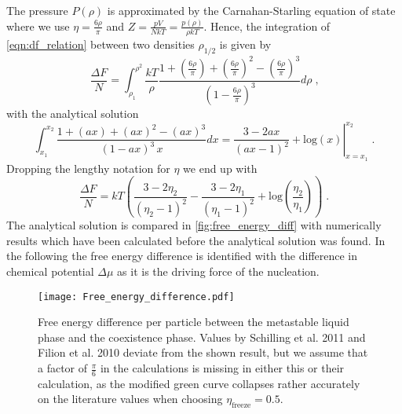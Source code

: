 The pressure $P(\rho)$ is approximated by the Carnahan-Starling equation of state where we use $\eta = \frac{6 \rho }{\pi}$ and $Z=\frac{pV}{NkT} = \frac{p(\rho)}{\rho kT}$. Hence, the integration of \autoref{eqn:df_relation} between two densities $\rho_{1/2}$ is given by
\begin{equation}
\frac{\Delta F}{N} = \int_{\rho_1}^{\rho^2} \frac{kT}{\rho} \frac{1+\left( \frac{6 \rho}{\pi}\right) +\left( \frac{6 \rho}{\pi}\right)^2 - \left( \frac{6 \rho}{\pi}\right)^3}{\left( 1 - \frac{6 \rho}{\pi}\right)^3} d\rho \; \text{,}
\end{equation}
with the analytical solution
\begin{equation}
\int_{x_1}^{x_2} \frac{1+(ax) +(ax)^2 - (ax)^3 }{( 1 - ax )^3 \,  x} dx = \left. \frac{3-2ax}{(ax-1)^2} + \text{log}(x) \right|_{x=x_1}^{x_2} \; \text{.}
\end{equation}
Dropping the lengthy notation for $\eta$ we end up with
\begin{equation}
\frac{\Delta F}{N} = kT \left(  \frac{3-2 \eta_2}{(\eta_2 - 1)^2} - \frac{3-2 \eta_1}{(\eta_1 - 1)^2} + \text{log}\left( \frac{\eta_2}{\eta_1} \right) \right) \; \text{.}
\end{equation}
The analytical solution is compared in \autoref{fig:free_energy_diff} with numerically results which have been calculated before the analytical solution was found. In the following the free energy difference is identified with the difference in chemical potential $\Delta \mu$ as it is the driving force of the nucleation.\\
\begin{figure}[h]
\centering
\texttt{[image: Free\_energy\_difference.pdf]}
\caption[Free energy difference between fluid and solid phase]{Free energy difference per particle between the metastable liquid phase and the coexistence phase. Values by Schilling et al. 2011\cite{Schilling2011} and Filion et al. 2010\cite{Filion2010a} deviate from the shown result, but we assume that a factor of $\frac{\pi}{6}$ in the calculations is missing in either this or their calculation, as the modified green curve collapses rather accurately on the literature values when choosing $\eta_{\text{freeze}}=0.5$.}
\label{fig:free_energy_diff}
\end{figure}


